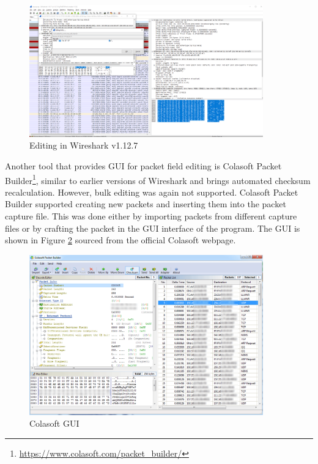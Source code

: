 \documentclass[
  printed,     %
  color,       %
  oneside,     %
  nosansbold,  %
  nocolorbold, %
  nolof,         %
  nolot,         %
]{fithesis4}
\begin{document}
\begin{figure}[h]
  \begin{center}
    \includegraphics[width=0.9\textwidth]{images/wireshark_editing.png}
  \end{center}
  \caption{Editing in Wireshark v1.12.7}
  \label{fig:editwiresh}
\end{figure}

Another tool that provides GUI for packet field editing is Colasoft Packet Builder\footnote{\url{https://www.colasoft.com/packet_builder/}}, similar to earlier versions of Wireshark and brings automated checksum recalculation. However, bulk editing was again not supported. Colasoft Packet Builder supported creating new packets and inserting them into the packet capture file. This was done either by importing packets from different capture files or by crafting the packet in the GUI interface of the program. The GUI is shown in Figure \ref{fig:colasoft} sourced from the official Colasoft webpage.

\begin{figure}[h]
  \begin{center}
    \includegraphics[width=0.9\textwidth]{images/colasoft.png}
  \end{center}
  \caption{Colasoft GUI}
  \label{fig:colasoft}
\end{figure}
\end{document}
